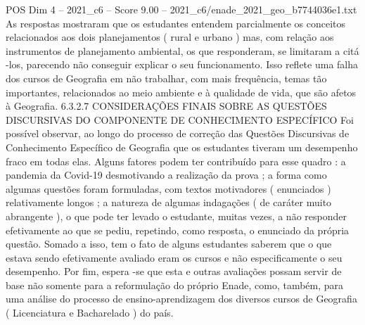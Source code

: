\begin{textsample}{POS Dim 4 – 2021\_c6 – Score 9.00 – 2021\_c6/enade\_2021\_geo\_b7744036e1.txt}
As respostas mostraram que os estudantes entendem parcialmente os conceitos relacionados aos dois planejamentos ( rural e urbano ) mas, com relação aos instrumentos de planejamento ambiental, os que responderam, se limitaram a citá -los, parecendo não conseguir explicar o seu funcionamento.
Isso reflete uma falha dos cursos de Geografia em não trabalhar, com mais frequência, temas tão importantes, relacionados ao meio ambiente e à qualidade de vida, que são afetos à Geografia. 6.3.2.7 CONSIDERAÇÕES FINAIS SOBRE AS QUESTÕES DISCURSIVAS DO COMPONENTE DE CONHECIMENTO ESPECÍFICO Foi possível observar, ao longo do processo de correção das Questões Discursivas de Conhecimento Específico de Geografia que os estudantes tiveram um desempenho fraco em todas elas.
Alguns fatores podem ter contribuído para esse quadro : a pandemia da Covid-19 desmotivando a realização da prova ; a forma como algumas questões foram formuladas, com textos motivadores ( enunciados ) relativamente longos ; a natureza de algumas indagações ( de caráter muito abrangente ), o que pode ter levado o estudante, muitas vezes, a não responder efetivamente ao que se pediu, repetindo, como resposta, o enunciado da própria questão.
Somado a isso, tem o fato de alguns estudantes saberem que o que estava sendo efetivamente avaliado eram os cursos e não especificamente o seu desempenho.
Por fim, espera -se que esta e outras avaliações possam servir de base não somente para a reformulação do próprio Enade, como, também, para uma análise do processo de ensino-aprendizagem dos diversos cursos de Geografia ( Licenciatura e Bacharelado ) do país.

\end{textsample}
